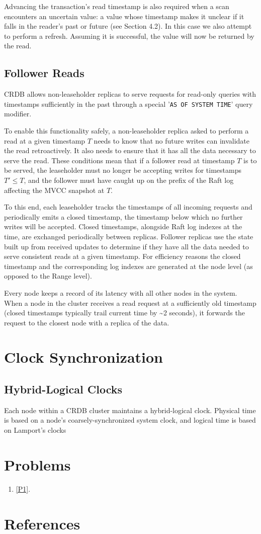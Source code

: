 \documentclass[11pt]{article}
\begin{document}
Advancing the transaction's read timestamp is also required when a scan encounters an uncertain value:
a value whose timestamp makes it unclear if it falls in the reader's past or future (see Section 4.2).
In this case we also attempt to perform a refresh. Assuming it is successful, the value will now be
returned by the read.
\subsection{Follower Reads}
\label{sec:orga6afd1c}
CRDB allows non-leaseholder replicas to serve requests for read-only queries with timestamps
sufficiently in the past through a special '\texttt{AS OF SYSTEM TIME}' query modifier.

To enable this functionality safely, a non-leaseholder replica asked to perform a read at a given
timestamp \(T\) needs to know that no future writes can invalidate the read retroactively. It also
needs to ensure that it has all the data necessary to serve the read. These conditions mean that if a
follower read at timestamp \(T\) is to be served, the leaseholder must no longer be accepting writes
for timestamps \(T'\le T\), and the follower must have caught up on the prefix of the Raft log
affecting the MVCC snapshot at \(T\).

To this end, each leaseholder tracks the timestamps of all incoming requests and periodically emits a
closed timestamp, the timestamp below which no further writes will be accepted. Closed timestamps,
alongside Raft log indexes at the time, are exchanged periodically between replicas. Follower replicas
use the state built up from received updates to determine if they have all the data needed to serve
consistent reads at a given timestamp. For efficiency reasons the closed timestamp and the
corresponding log indexes are generated at the node level (as opposed to the Range level).

Every node keeps a record of its latency with all other nodes in the system. When a node in the
cluster receives a read request at a sufficiently old timestamp (closed timestamps typically trail
current time by \textasciitilde{}2 seconds), it forwards the request to the closest node with a replica of the data.
\section{Clock Synchronization}
\label{sec:org6c3e980}
\subsection{Hybrid-Logical Clocks}
\label{sec:org8dbd25b}
Each node within a CRDB cluster maintains a hybrid-logical clock. Physical time is based on a node’s
coarsely-synchronized system clock, and logical time is based on Lamport’s clocks
\section{Problems}
\label{sec:orgd0d7acf}
\begin{enumerate}
\item \ref{P1}.
\end{enumerate}
\section{References}
\label{sec:org430be00}
\label{bibliographystyle link}


\label{bibliography link}

\end{document}
